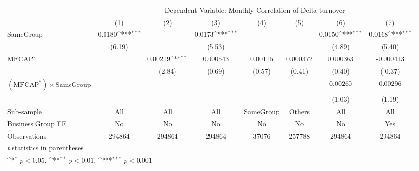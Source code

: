 {
\def\sym#1{\ifmmode^{#1}\else\(^{#1}\)\fi}
\begin{tabular}{l*{7}{c}}
\hline\hline
                    &\multicolumn{7}{c}{Dependent Variable:  Monthly Correlation of Delta turnover}                                                                           \\\cmidrule(lr){2-8}
                    &\multicolumn{1}{c}{(1)}         &\multicolumn{1}{c}{(2)}         &\multicolumn{1}{c}{(3)}         &\multicolumn{1}{c}{(4)}         &\multicolumn{1}{c}{(5)}         &\multicolumn{1}{c}{(6)}         &\multicolumn{1}{c}{(7)}         \\
\hline
SameGroup           &      0.0180\sym{***}&                     &      0.0173\sym{***}&                     &                     &      0.0150\sym{***}&      0.0168\sym{***}\\
                    &      (6.19)         &                     &      (5.53)         &                     &                     &      (4.89)         &      (5.40)         \\
[1em]
$ \text{MFCAP*} $   &                     &     0.00219\sym{**} &    0.000543         &     0.00115         &    0.000372         &    0.000363         &   -0.000413         \\
                    &                     &      (2.84)         &      (0.69)         &      (0.57)         &      (0.41)         &      (0.40)         &     (-0.37)         \\
[1em]
 $ (\text{MFCAP}^*) \times {\text{SameGroup} }  $ &                     &                     &                     &                     &                     &     0.00260         &     0.00296         \\
                    &                     &                     &                     &                     &                     &      (1.03)         &      (1.19)         \\
\hline
Sub-sample          &         All         &         All         &         All         &   SameGroup         &      Others         &         All         &         All         \\
Business Group FE   &          No         &          No         &          No         &          No         &          No         &          No         &         Yes         \\
Observations        &      294864         &      294864         &      294864         &       37076         &      257788         &      294864         &      294864         \\
\hline\hline
\multicolumn{8}{l}{\footnotesize \textit{t} statistics in parentheses}\\
\multicolumn{8}{l}{\footnotesize \sym{*} \(p<0.05\), \sym{**} \(p<0.01\), \sym{***} \(p<0.001\)}\\
\end{tabular}
}
